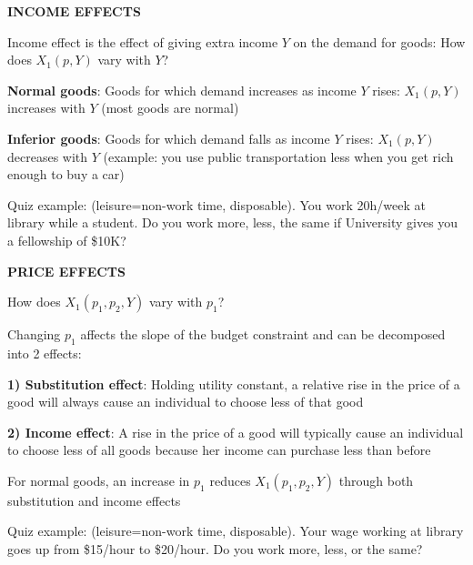 \documentclass[landscape]{slides}
\begin{document}
\begin{slide}

\end{slide}

\begin{slide}
\begin{center}
{\bf INCOME EFFECTS}
\end{center}
Income effect is the effect of giving extra income $Y$ on the demand for goods:
How does $X_1(p,Y)$ vary with $Y$?

{\bf Normal goods}:
Goods for which demand increases as income $Y$ rises: $X_1(p,Y)$ increases with $Y$
(most goods are normal)

{\bf Inferior goods}:
Goods for which demand falls as income $Y$ rises:  $X_1(p,Y)$ decreases with $Y$
(example: you use public transportation less when you get
rich enough to buy a car)

Quiz example: (leisure=non-work time, disposable). You work 20h/week at library while a student.
Do you work more, less, the same if University gives you a fellowship of \$10K?

\end{slide}

\begin{slide}
\begin{center}
{\bf PRICE EFFECTS}
\end{center}
How does $X_1(p_1,p_2,Y)$ vary with $p_1$?

Changing $p_1$ affects the slope of the budget constraint and can be decomposed into
2 effects:

{\bf 1) Substitution effect}:
Holding
utility constant, a relative rise in
the price of a good will always
cause an individual to choose
less of that good

{\bf 2) Income effect}:
A rise in the
price of a good will typically
cause an individual to choose
less of all goods because her
income can purchase less than
before

For normal goods, an increase in $p_1$ reduces $X_1(p_1,p_2,Y)$ through both substitution
and income effects

\small
Quiz example: (leisure=non-work time, disposable). Your wage working at library goes up
from \$15/hour to \$20/hour. Do you work more, less, or the same?

\end{slide}



\begin{slide}

\end{slide}
\end{document}
